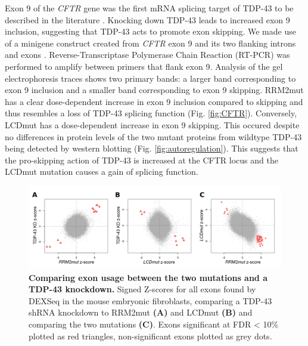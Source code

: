 Exon 9 of the \textit{CFTR} gene was the first mRNA splicing target of TDP-43 to be described in the literature \citep{Buratti2001-et}. Knocking down TDP-43 leads to increased exon 9 inclusion, suggesting that TDP-43 acts to promote exon skipping. 
We made use of a minigene construct created from \textit{CFTR} exon 9 and its two flanking introns and exons \citep{Buratti2007minigene}.
Reverse-Transcriptase Polymerase Chain Reaction (RT-PCR) was performed to amplify between primers that flank exon 9. 
Analysis of the gel electrophoresis traces shows two primary bands: a larger band corresponding to exon 9 inclusion and a smaller band corresponding to exon 9 skipping. 
RRM2mut has a clear dose-dependent increase in exon 9 inclusion compared to skipping and thus resembles a loss of TDP-43 splicing function (Fig.  \ref{fig:CFTR}). 
Conversely, LCDmut has a dose-dependent increase in exon 9 skipping.
This occured despite no differences in protein levels of the two mutant proteins from wildtype TDP-43 being detected by western blotting (Fig. \ref{fig:autoregulation}).
This suggests that the pro-skipping action of TDP-43 is increased at the CFTR locus and the LCDmut mutation causes a gain of splicing function.

\begin{figure}[h]
	\centering
	\includegraphics[width=\textwidth]{Figures/05_tdp_mice/mef_scatters.png}
	\caption[Comparing exon usage between the two mutations and a TDP-43 knockdown]{
		\textbf{Comparing exon usage between the two mutations and a TDP-43 knockdown.}
	Signed Z-scores for all exons found by DEXSeq in the mouse embryonic fibroblasts, comparing a TDP-43 shRNA knockdown to RRM2mut \textbf{(A)} and LCDmut \textbf{(B)} and comparing the two mutations \textbf{(C)}. Exons significant at FDR < 10\% plotted as red triangles, non-significant exons plotted as grey dots.
}
	\label{fig:mef_scatters}
\end{figure}


